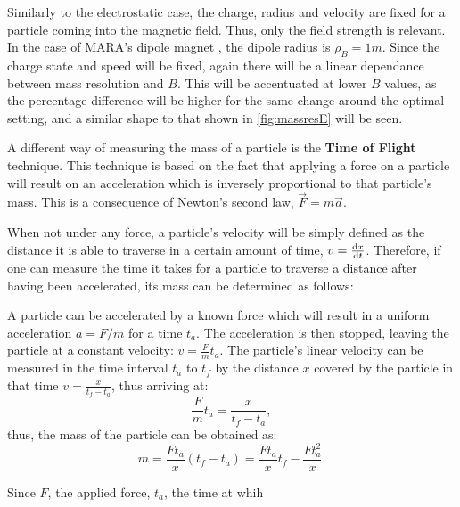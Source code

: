 Similarly to the electrostatic case, the charge, radius and velocity are fixed for a particle coming into the magnetic field. Thus, only the field strength is relevant. In the case of MARA's dipole magnet \cite{saren}, the dipole radius is $\rho_B = 1\unit{m}$. Since the charge state and speed will be fixed, again there will be a linear dependance between mass resolution and $B$. This will be accentuated at lower $B$ values, as the percentage difference will be higher for the same change around the optimal setting, and a similar shape to that shown in \autoref{fig:massresE} will be seen.

A different way of measuring the mass of a particle is the \textbf{Time of Flight} technique. This technique is based on the fact that applying a force on a particle will result on an acceleration which is inversely proportional to that particle's mass. This is a consequence of Newton's second law, $\vec F = m \vec a$. 

When not under any force, a particle's velocity will be simply defined as the distance it is able to traverse in a certain amount of time, $v = \frac{\text{d} x}{\text{d} t}$. Therefore, if one can measure the time it takes for a particle to traverse a distance after having been accelerated, its mass can be determined as follows:

A particle can be accelerated by a known force which will result in a uniform acceleration $a = F/m$ for a time $t_a$. The acceleration is then stopped, leaving the particle at a constant velocity: $v = \frac{F}{m}t_a$. The particle's linear velocity can be measured in the time interval $t_a$ to $t_f$ by the distance $x$ covered by the particle in that time $v = \frac{x}{t_f - t_a}$, thus arriving at:
\begin{equation*}
    \frac{F}{m} t_a  = \frac{x}{t_f-t_a},
\end{equation*}
thus, the mass of the particle can be obtained as: 
\begin{equation}
    \label{eq:tof}
    m = \frac{Ft_a}{x} (t_f-t_a) = \frac{Ft_a}{x} t_f- \frac{Ft_a^2}{x}.
\end{equation}

Since $F$, the applied force, $t_a$, the time at whih
